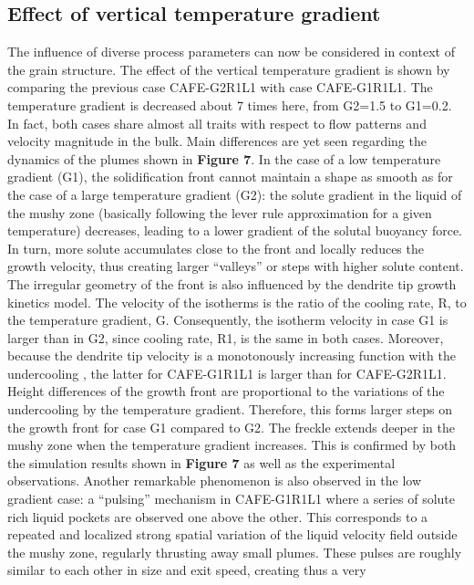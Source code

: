\subsection{Effect of vertical temperature gradient}
The influence of diverse process parameters can now be considered in context of the grain structure. 
The effect of the vertical temperature gradient is shown by comparing the previous case CAFE-G2R1L1 
with case CAFE-G1R1L1. The temperature gradient is decreased about 7 times here, from G2=\SI{1.5}{\ugradT}
to G1=\SI{0.2}{\ugradT}. In fact, both cases share almost all traits with respect to flow patterns and velocity
magnitude in the bulk. Main differences are yet seen regarding the dynamics of the plumes shown in 
\textbf{Figure 7}. In the case of a low temperature gradient (G1), the solidification front cannot maintain a 
shape as smooth as for the case of a large temperature gradient (G2): the solute gradient in the 
liquid of the mushy zone (basically following the lever rule approximation for a given temperature) 
decreases, leading to a lower gradient of the solutal buoyancy force. In turn, more solute accumulates 
close to the front and locally reduces the growth velocity, thus creating larger “valleys” or steps 
with higher solute content. The irregular geometry of the front is also influenced by the dendrite tip 
growth kinetics model. The velocity of the isotherms is the ratio of the cooling rate, R, to the 
temperature gradient, G. Consequently, the isotherm velocity in case G1 is larger than in G2, since 
cooling rate, R1, is the same in both cases. Moreover, because the dendrite tip velocity is a monotonously 
increasing function with the undercooling \citep{gandin_boundary_2003}, the latter for CAFE-G1R1L1 is larger 
than for CAFE-G2R1L1. Height differences of the growth front are proportional to the variations of the 
undercooling by the temperature gradient. Therefore, this forms larger steps on the growth front for case 
G1 compared to G2. The freckle extends deeper in the mushy zone when the temperature gradient increases. 
This is confirmed by both the simulation results shown in \textbf{Figure 7} as well as the experimental observations. 
Another remarkable phenomenon is also observed in the low gradient case: a “pulsing” mechanism in CAFE-G1R1L1 
where a series of solute rich liquid pockets are observed one above the other. This corresponds to a repeated
and localized strong spatial variation of the liquid velocity field outside the mushy zone, regularly thrusting 
away small plumes. These pulses are roughly similar to each other in size and exit speed, creating thus a very 
